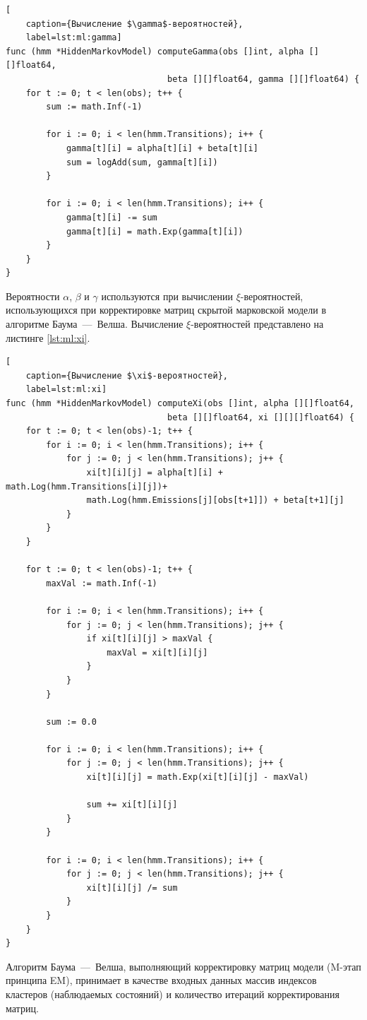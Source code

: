 \begin{lstlisting}[
	caption={Вычисление $\gamma$-вероятностей},
	label=lst:ml:gamma]
func (hmm *HiddenMarkovModel) computeGamma(obs []int, alpha [][]float64, 
								beta [][]float64, gamma [][]float64) {
	for t := 0; t < len(obs); t++ {
		sum := math.Inf(-1)
		
		for i := 0; i < len(hmm.Transitions); i++ {
			gamma[t][i] = alpha[t][i] + beta[t][i]
			sum = logAdd(sum, gamma[t][i])
		}
		
		for i := 0; i < len(hmm.Transitions); i++ {
			gamma[t][i] -= sum
			gamma[t][i] = math.Exp(gamma[t][i])
		}
	}
}
\end{lstlisting}
Вероятности $\alpha$, $\beta$ и $\gamma$ используются при вычислении $\xi$-вероятностей, использующихся при корректировке матриц скрытой марковской модели в алгоритме Баума~---~Велша. Вычисление $\xi$-вероятностей представлено на листинге  \ref{lst:ml:xi}.
\begin{lstlisting}[
	caption={Вычисление $\xi$-вероятностей},
	label=lst:ml:xi]
func (hmm *HiddenMarkovModel) computeXi(obs []int, alpha [][]float64, 
								beta [][]float64, xi [][][]float64) {
	for t := 0; t < len(obs)-1; t++ {
		for i := 0; i < len(hmm.Transitions); i++ {
			for j := 0; j < len(hmm.Transitions); j++ {
				xi[t][i][j] = alpha[t][i] + math.Log(hmm.Transitions[i][j])+
				math.Log(hmm.Emissions[j][obs[t+1]]) + beta[t+1][j]
			}
		}
	}
	
	for t := 0; t < len(obs)-1; t++ {
		maxVal := math.Inf(-1)
		
		for i := 0; i < len(hmm.Transitions); i++ {
			for j := 0; j < len(hmm.Transitions); j++ {
				if xi[t][i][j] > maxVal {
					maxVal = xi[t][i][j]
				}
			}
		}
		
		sum := 0.0
		
		for i := 0; i < len(hmm.Transitions); i++ {
			for j := 0; j < len(hmm.Transitions); j++ {
				xi[t][i][j] = math.Exp(xi[t][i][j] - maxVal)
				
				sum += xi[t][i][j]
			}
		}
		
		for i := 0; i < len(hmm.Transitions); i++ {
			for j := 0; j < len(hmm.Transitions); j++ {
				xi[t][i][j] /= sum
			}
		}
	}
}
\end{lstlisting}
Алгоритм Баума~---~Велша, выполняющий корректировку матриц модели (M-этап принципа EM), принимает в качестве входных данных массив индексов кластеров (наблюдаемых состояний) и количество итераций корректирования матриц. 

